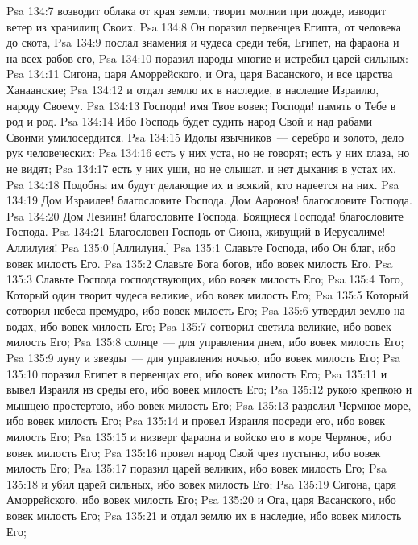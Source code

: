 \vs Psa 134:7 возводит облака от края земли, творит молнии при дожде, изводит ветер из хранилищ Своих.
\vs Psa 134:8 Он поразил первенцев Египта, от человека до скота,
\vs Psa 134:9 послал знамения и чудеса среди тебя, Египет, на фараона и на всех рабов его,
\vs Psa 134:10 поразил народы многие и истребил царей сильных:
\vs Psa 134:11 Сигона, царя Аморрейского, и Ога, царя Васанского, и все царства Ханаанские;
\vs Psa 134:12 и отдал землю их в наследие, в наследие Израилю, народу Своему.
\vs Psa 134:13 Господи! имя Твое вовек; Господи! память о Тебе в род и род.
\vs Psa 134:14 Ибо Господь будет судить народ Свой и над рабами Своими умилосердится.
\vs Psa 134:15 Идолы язычников~--- серебро и золото, дело рук человеческих:
\vs Psa 134:16 есть у них уста, но не говорят; есть у них глаза, но не видят;
\vs Psa 134:17 есть у них уши, но не слышат, и нет дыхания в устах их.
\vs Psa 134:18 Подобны им будут делающие их и всякий, кто надеется на них.
\vs Psa 134:19 Дом Израилев! благословите Господа. Дом Ааронов! благословите Господа.
\vs Psa 134:20 Дом Левиин! благословите Господа. Боящиеся Господа! благословите Господа.
\vs Psa 134:21 Благословен Господь от Сиона, живущий в Иерусалиме! Аллилуия!
\vs Psa 135:0 [Аллилуия.]
\rsbpar\vs Psa 135:1 Славьте Господа, ибо Он благ, ибо вовек милость Его.
\vs Psa 135:2 Славьте Бога богов, ибо вовек милость Его.
\vs Psa 135:3 Славьте Господа господствующих, ибо вовек милость Его;
\vs Psa 135:4 Того, Который один творит чудеса великие, ибо вовек милость Его;
\vs Psa 135:5 Который сотворил небеса премудро, ибо вовек милость Его;
\vs Psa 135:6 утвердил землю на водах, ибо вовек милость Его;
\vs Psa 135:7 сотворил светила великие, ибо вовек милость Его;
\vs Psa 135:8 солнце~--- для управления днем, ибо вовек милость Его;
\vs Psa 135:9 луну и звезды~--- для управления ночью, ибо вовек милость Его;
\vs Psa 135:10 поразил Египет в первенцах его, ибо вовек милость Его;
\vs Psa 135:11 и вывел Израиля из среды его, ибо вовек милость Его;
\vs Psa 135:12 рукою крепкою и мышцею простертою, ибо вовек милость Его;
\vs Psa 135:13 разделил Чермное море, ибо вовек милость Его;
\vs Psa 135:14 и провел Израиля посреди его, ибо вовек милость Его;
\vs Psa 135:15 и низверг фараона и войско его в море Чермное, ибо вовек милость Его;
\vs Psa 135:16 провел народ Свой чрез пустыню, ибо вовек милость Его;
\vs Psa 135:17 поразил царей великих, ибо вовек милость Его;
\vs Psa 135:18 и убил царей сильных, ибо вовек милость Его;
\vs Psa 135:19 Сигона, царя Аморрейского, ибо вовек милость Его;
\vs Psa 135:20 и Ога, царя Васанского, ибо вовек милость Его;
\vs Psa 135:21 и отдал землю их в наследие, ибо вовек милость Его;
